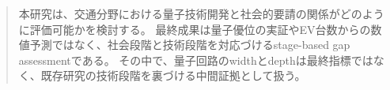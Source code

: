 \begin{abstract}
本研究は、交通分野における量子技術開発と社会的要請の関係がどのように評価可能かを検討する。
最終成果は量子優位の実証やEV台数からの数値予測ではなく、社会段階と技術段階を対応づけるstage-based gap assessmentである。
その中で、量子回路のwidthとdepthは最終指標ではなく、既存研究の技術段階を裏づける中間証拠として扱う。
\end{abstract}
